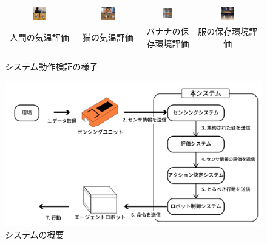 \documentclass[paper=a4paper,jafontsize=9pt,head_space=15mm,gutter=20mm,
twocolumn,number_of_lines=49, line_length=26zw]{myuarticle}
\begin{document}
\setcounter{figure}{2}
\begin{figure}[t]
  \centering
  \begin{tabular}{cccc}
    \includegraphics[width=0.22\textwidth]{resources/human.png} &
    \includegraphics[width=0.22\textwidth]{resources/cat.png} &
    \includegraphics[width=0.22\textwidth]{resources/banana.png} &
    \includegraphics[width=0.22\textwidth]{resources/clothes.png} \\
    人間の気温評価 & 猫の気温評価 & バナナの保存環境評価 & 服の保存環境評価
  \end{tabular}
  \caption{システム動作検証の様子}
  \label{fig:system-test}
\end{figure}

\setcounter{figure}{1}
\begin{figure}[h]
  \centering
  \includegraphics[keepaspectratio,width=0.8\columnwidth]{resources/system_structure.png}
  \caption{システムの概要}
  \label{fig:system-structure}
\end{figure}
\end{document}
